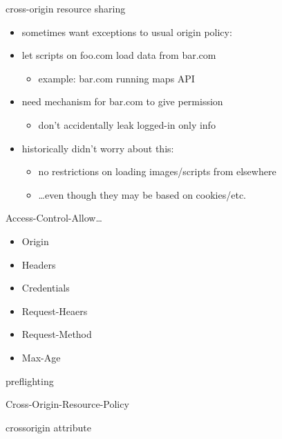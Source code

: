 \begin{frame}{cross-origin resource sharing}
    \begin{itemize}
    \item sometimes want exceptions to usual origin policy:
    \vspace{.5cm}
    \item let scripts on foo.com load data from bar.com
        \begin{itemize}
        \item example: bar.com running maps API
        \end{itemize}
    \item need mechanism for bar.com to give permission
        \begin{itemize}
        \item don't accidentally leak logged-in only info
        \end{itemize}
    \item historically didn't worry about this:
        \begin{itemize}
        \item no restrictions on loading images/scripts from elsewhere
        \item \ldots even though they may be based on cookies/etc.
        \end{itemize}
    \end{itemize}
\end{frame}

\begin{frame}{Access-Control-Allow\ldots}
    \begin{itemize}
    \item Origin
    \item Headers
    \item Credentials
    \item Request-Heaers
    \item Request-Method
    \item Max-Age
    \end{itemize}
\end{frame}

\begin{frame}{preflighting}
\end{frame}

\begin{frame}{Cross-Origin-Resource-Policy}
\end{frame}

\begin{frame}{crossorigin attribute}
\end{frame}
